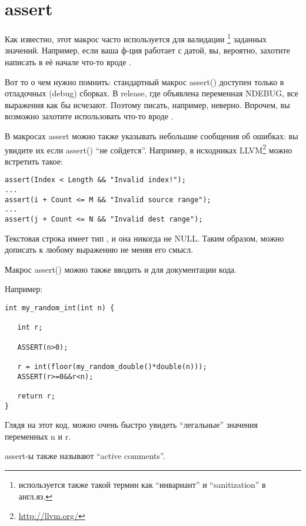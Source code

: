 ﻿\section{assert}

Как известно, этот макрос часто используется для валидации
\footnote{используется также такой термин как ``инвариант'' и ``sanitization'' в англ.яз.} заданных значений. 
Например, если ваша ф-ция
работает с датой, вы, вероятно, захотите написать в её начале что-то вроде .

Вот то о чем нужно помнить: стандартный макрос assert() доступен только в отладочных (debug) сборках. 
В release, где объявлена переменная NDEBUG,
все выражения как бы исчезают. Поэтому писать, например,  неверно. Впрочем,
вы возможно захотите использовать что-то вроде .

В макросах assert можно также указывать небольшие сообщения об ошибках: 
вы увидите их если assert() ``не сойдется''. 
Например, в исходниках LLVM\footnote{\url{http://llvm.org/}} можно встретить такое:

\begin{lstlisting}
assert(Index < Length && "Invalid index!");
...
assert(i + Count <= M && "Invalid source range");
...
assert(j + Count <= N && "Invalid dest range");
\end{lstlisting}

Текстовая строка имеет тип , и она никогда не NULL. 
Таким образом, можно дописать к любому выражению  не меняя его смысл.

Макрос assert() можно также вводить и для документации кода.

Например:

\begin{lstlisting}[caption=GNU Chess]
int my_random_int(int n) {

   int r;

   ASSERT(n>0);

   r = int(floor(my_random_double()*double(n)));
   ASSERT(r>=0&&r<n);

   return r;
}
\end{lstlisting}

Глядя на этот код, можно очень быстро увидеть ``легальные'' значения переменных n и r.

assert-ы также называют ``active comments''\cite{Lakos}.

